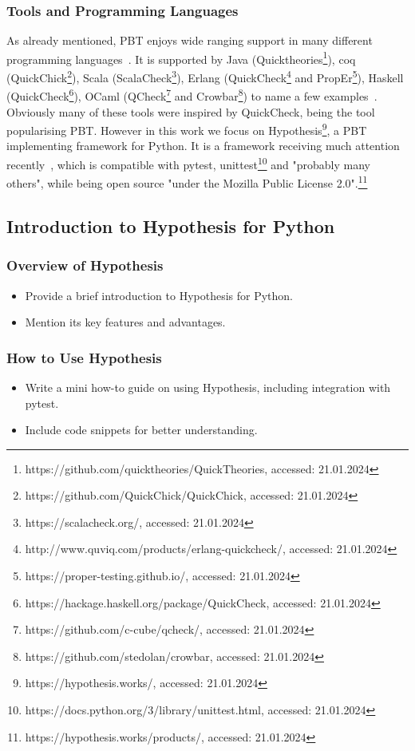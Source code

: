 \documentclass[runningheads]{llncs}
\begin{document}
\subsubsection{Tools and Programming Languages}
As already mentioned, PBT enjoys wide ranging support in many different programming languages~\cite{Chen2022,Shi2023}. It is supported by Java (Quicktheories\footnote{https://github.com/quicktheories/QuickTheories, accessed: 21.01.2024}), coq (QuickChick\footnote{https://github.com/QuickChick/QuickChick, accessed: 21.01.2024}), Scala (ScalaCheck\footnote{https://scalacheck.org/, accessed: 21.01.2024}), Erlang (QuickCheck\footnote{http://www.quviq.com/products/erlang-quickcheck/, accessed: 21.01.2024} and PropEr\footnote{https://proper-testing.github.io/, accessed: 21.01.2024}), Haskell (QuickCheck\footnote{https://hackage.haskell.org/package/QuickCheck, accessed: 21.01.2024}), OCaml (QCheck\footnote{https://github.com/c-cube/qcheck/, accessed: 21.01.2024} and Crowbar\footnote{https://github.com/stedolan/crowbar, accessed: 21.01.2024}) to name a few examples~\cite{MacIver2016,Padhye2019,Paraskevopoulou2015,Arts2008,Papadakis2011,Claessen2000}. Obviously many of these tools were inspired by QuickCheck, being the tool popularising PBT. However in this work we focus on Hypothesis\footnote{https://hypothesis.works/, accessed: 21.01.2024}, a PBT implementing framework for Python. It is a framework receiving much attention recently~\cite{Corgozinho2023,MacIver2019}, which is compatible with pytest, unittest\footnote{https://docs.python.org/3/library/unittest.html, accessed: 21.01.2024} and "probably many others", while being open source "under the Mozilla Public License 2.0".\footnote{https://hypothesis.works/products/, accessed: 21.01.2024}

\subsection{Introduction to Hypothesis for Python}
\subsubsection{Overview of Hypothesis}
\begin{itemize}
  \item Provide a brief introduction to Hypothesis for Python.
  \item Mention its key features and advantages.
\end{itemize}

\subsubsection{How to Use Hypothesis}
\begin{itemize}
  \item Write a mini how-to guide on using Hypothesis, including integration with pytest.
  \item Include code snippets for better understanding.
\end{itemize}
\end{document}
